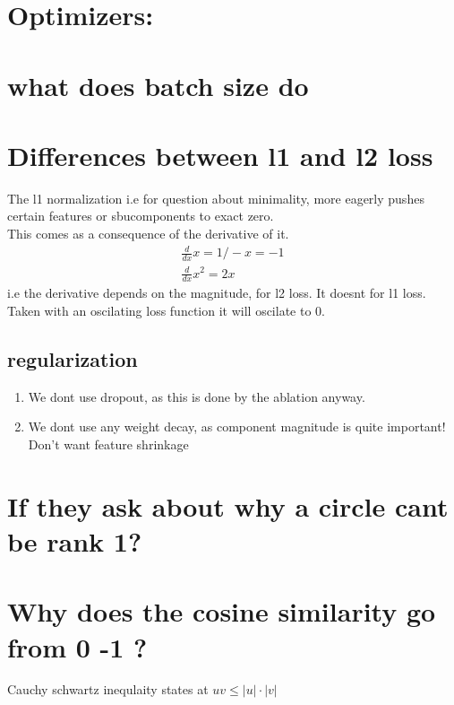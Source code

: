 \documentclass[12pt]{article}
\title{}
\date{\today}
\author{Knud Sønderbek}
\begin{document}
\maketitle
\thispagestyle{empty}
\newpage
\tableofcontents
\thispagestyle{empty}
\newpage
{}
\section{Optimizers:}
\section{what does batch size do}
\section{Differences between l1 and l2 loss}
The l1 normalization i.e for question about minimality, more eagerly pushes certain features or sbucomponents to exact  zero. \\
This comes as a consequence of the derivative of it.
\begin{align*}
    \frac{d}{dx}x = 1 / -x = -1 \\
    \frac{d}{dx}x^2=2x
\end{align*}
i.e the derivative depends on the magnitude, for l2 loss. It doesnt for l1 loss. Taken with an oscilating loss function it will oscilate to  0.


\subsection{regularization}
\begin{enumerate}
    \setlength\itemsep{0em}
    \item We dont use dropout, as this is done by the ablation anyway.
    \item We dont use any weight decay, as component magnitude is quite important! Don't want feature shrinkage
\end{enumerate}
\section{If they ask about why a circle cant be rank 1?}



\section{Why does the cosine similarity go from 0 -1 ?}
Cauchy schwartz inequlaity states at $uv \leq |u| \cdot |v|$
\end{document}
